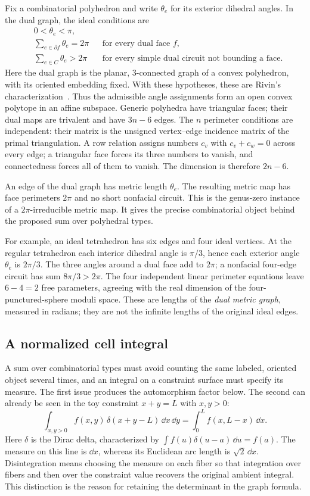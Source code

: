 Fix a combinatorial polyhedron and write $\theta_e$ for its exterior dihedral
angles. In the dual graph, the ideal conditions are
\begin{align}
 &0<\theta_e<\pi,\label{eq:rivinangles1}\\
 &\sum_{e\in\partial f}\theta_e=2\pi
       &&\text{for every dual face }f,\label{eq:rivinangles2}\\
 &\sum_{e\in C}\theta_e>2\pi
       &&\text{for every simple dual circuit not bounding a face.}
       \label{eq:rivinangles3}
\end{align}
Here the dual graph is the planar, $3$-connected graph of a convex
polyhedron, with its oriented embedding fixed. With these hypotheses, these
are Rivin's characterization~\cite{RivinAngles}. Thus the admissible angle
assignments form an open convex polytope in an affine subspace. Generic
polyhedra have triangular faces; their dual maps are trivalent and have
$3n-6$ edges. The $n$ perimeter conditions are independent: their matrix
is the unsigned vertex--edge incidence matrix of the primal triangulation.
A row relation assigns numbers $c_v$ with $c_v+c_w=0$ across every edge;
a triangular face forces its three numbers to vanish, and connectedness
forces all of them to vanish. The dimension is therefore $2n-6$.

An edge of the dual graph has metric length $\theta_e$. The resulting metric
map has face perimeters $2\pi$ and no short nonfacial circuit. This is the
genus-zero instance of a $2\pi$-irreducible metric map. It gives the precise
combinatorial object behind the proposed sum over polyhedral types.

For example, an ideal tetrahedron has six edges and four ideal
vertices. At the regular tetrahedron each interior dihedral angle
is $\pi/3$, hence each exterior angle $\theta_e$ is $2\pi/3$.
The three angles around a dual face add to $2\pi$; a nonfacial
four-edge circuit has sum $8\pi/3>2\pi$. The four independent
linear perimeter equations leave $6-4=2$ free parameters, agreeing
with the real dimension of the four-punctured-sphere moduli space.
These are lengths of the \emph{dual metric graph}, measured in
radians; they are not the infinite lengths of the original ideal edges.

\subsection{A normalized cell integral}

A sum over combinatorial types must avoid counting the same labeled,
oriented object several times, and an integral on a constraint surface
must specify its measure. The first issue produces the automorphism
factor below. The second can already be seen in the toy constraint
$x+y=L$ with $x,y>0$:
\[
 \int_{x,y>0} f(x,y)\,\delta(x+y-L)\,\dd x\,\dd y
   =\int_0^L f(x,L-x)\,\dd x.
\]
Here $\delta$ is the Dirac delta, characterized by
$\int f(u)\delta(u-a)\,\dd u=f(a)$.
The measure on this line is $\dd x$, whereas its Euclidean arc length
is $\sqrt2\,\dd x$. Disintegration means choosing the measure on
each fiber so that integration over fibers and then over the constraint
value recovers the original ambient integral. This distinction is the
reason for retaining the determinant in the graph formula.

